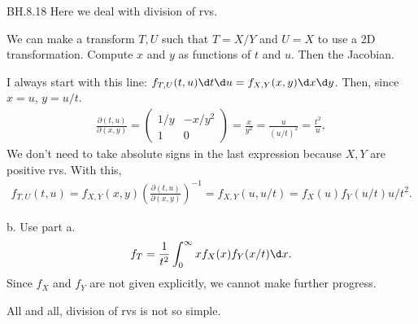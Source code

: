 
\setcounter{theorem}{17}
\begin{exercise} BH.8.18
 Here we deal with division of rvs.
\begin{hint} We can make a transform $T, U$ such that $T=X/Y$ and $U=X$  to use a 2D transformation. Compute $x$ and $y$ as functions of $t$ and $u$. Then the Jacobian.
\end{hint}
\begin{solution}
I always start with this line: $f_{T,U}(t,u) \d t \d u = f_{X,Y}(x,y) \d x \d y$.
Then, since $x=u$, $y=u/t$.
\begin{align*}
\frac{\partial (t, u)}{\partial (x,y)} =
  \begin{pmatrix}
1/y & -x/y^{2} \\
    1 & 0
  \end{pmatrix} = \frac{x}{y^{2}} = \frac{u}{(u/t)^{2}} = \frac{t^{2}}{u},
\end{align*}
We don't need to take absolute signs in the last expression because $X, Y$ are positive rvs.
With this,
\begin{align*}
  f_{T,U}(t,u) = f_{X,Y}(x,y) \left(\frac{\partial (t, u)}{\partial (x,y)}\right)^{-1} = f_{X,Y}(u,u/t) = f_X(u)f_Y(u/t) u/t^{2}.
\end{align*}

b. Use part a.
\begin{align*}
f_{T} = \frac 1{t^2} \int_0^{\infty} x f_X(x) f_Y(x/t) \d x.
\end{align*}
Since $f_X$ and $f_Y$ are not given explicitly, we cannot make further progress.

All and all, division of rvs is not so simple.
\end{solution}
\end{exercise}


